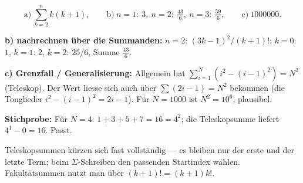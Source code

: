 \begin{ergebnis}
\begin{equation*}
  \text{a)}\ \sum_{k=2}^{n}k(k+1),\qquad
  \text{b)}\ n=1{:}\ 3,\ n=2{:}\ \tfrac{43}{6},\ n=3{:}\ \tfrac{59}{6},\qquad
  \text{c)}\ 1000000.
\end{equation*}
\end{ergebnis}

\begin{kontrolle}
\textbf{b) nachrechnen über die Summanden:} $n=2$: $(3k-1)^2/(k+1)!$:
$k=0$: $1$, $k=1$: $2$, $k=2$: $25/6$, Summe $\frac{43}{6}$. \checkmark

\textbf{c) Grenzfall / Generalisierung:} Allgemein hat
$\sum_{i=1}^{N}(i^2-(i-1)^2)=N^2$ (Teleskop). Der Wert liesse sich auch
über $\sum(2i-1)=N^2$ bekommen (die Tonglieder $i^2-(i-1)^2=2i-1$).
Für $N=1000$ ist $N^2=10^6$, plausibel.

\textbf{Stichprobe:} Für $N=4$: $1+3+5+7=16=4^2$; die Teleskopsumme
liefert $4^1-0=16$. Passt.
\end{kontrolle}

\begin{merksatz}
Teleskopsummen kürzen sich fast vollständig --- es bleiben nur der erste
und der letzte Term; beim $\Sigma$-Schreiben den passenden Startindex
wählen. Fakultätsummen nutzt man über $(k+1)!=(k+1)k!$.
\end{merksatz}
